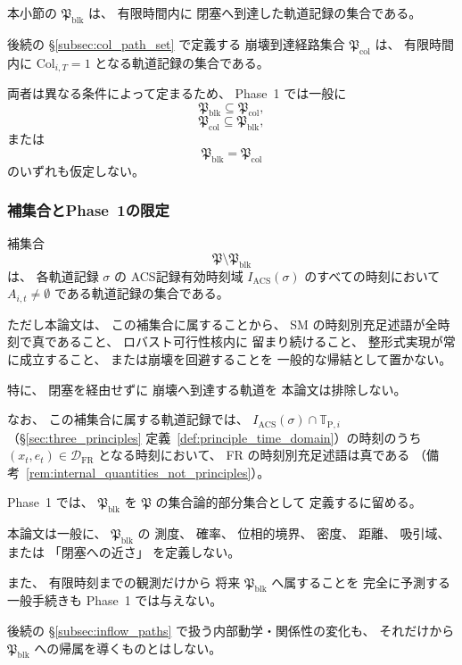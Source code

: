 \begin{remark}[閉塞経路集合と崩壊到達経路集合は別対象である]
\label{rem:blk_vs_col}
本小節の
$\mathfrak{P}_{\mathrm{blk}}$
は、
有限時間内に
閉塞へ到達した軌道記録の集合である。

後続の
\S\ref{subsec:col_path_set}
で定義する
崩壊到達経路集合
$\mathfrak{P}_{\mathrm{col}}$
は、
有限時間内に
$\mathrm{Col}_{i,T}=1$
となる軌道記録の集合である。

両者は異なる条件によって定まるため、
Phase~1 では一般に
\[
  \mathfrak{P}_{\mathrm{blk}}
  \subseteq
  \mathfrak{P}_{\mathrm{col}},
\]
\[
  \mathfrak{P}_{\mathrm{col}}
  \subseteq
  \mathfrak{P}_{\mathrm{blk}},
\]
または
\[
  \mathfrak{P}_{\mathrm{blk}}
  =
  \mathfrak{P}_{\mathrm{col}}
\]
のいずれも仮定しない。
\end{remark}

\subsubsection{補集合とPhase~1の限定}

\begin{remark}
\label{rem:blk_in_trajectory_space}
補集合
\[
  \mathfrak{P}
  \setminus
  \mathfrak{P}_{\mathrm{blk}}
\]
は、
各軌道記録 $\sigma$ の
ACS記録有効時刻域
$I_{\mathrm{ACS}}(\sigma)$
のすべての時刻において
$A_{i,t}\neq\emptyset$
である軌道記録の集合である。

ただし本論文は、
この補集合に属することから、
SM の時刻別充足述語が全時刻で真であること、
ロバスト可行性核内に
留まり続けること、
整形式実現が常に成立すること、
または崩壊を回避することを
一般的な帰結として置かない。

特に、
閉塞を経由せずに
崩壊へ到達する軌道を
本論文は排除しない。

なお、
この補集合に属する軌道記録では、
$I_{\mathrm{ACS}}(\sigma)\cap\mathbb{T}_{\mathrm{P},i}$（\S\ref{sec:three_principles} 定義~\ref{def:principle_time_domain}）の時刻のうち
$(x_t,e_t)\in\mathcal{D}_{\mathrm{FR}}$ となる時刻において、
FR の時刻別充足述語は真である
（備考~\ref{rem:internal_quantities_not_principles}）。
\end{remark}

\begin{remark}
\label{rem:blk_phase1_scope}
Phase~1 では、
$\mathfrak{P}_{\mathrm{blk}}$
を
$\mathfrak{P}$ の集合論的部分集合として
定義するに留める。

本論文は一般に、
$\mathfrak{P}_{\mathrm{blk}}$ の
測度、
確率、
位相的境界、
密度、
距離、
吸引域、
または
「閉塞への近さ」
を定義しない。

また、
有限時刻までの観測だけから
将来
$\mathfrak{P}_{\mathrm{blk}}$
へ属することを
完全に予測する一般手続きも
Phase~1 では与えない。

後続の
\S\ref{subsec:inflow_paths}
で扱う内部動学・関係性の変化も、
それだけから
$\mathfrak{P}_{\mathrm{blk}}$
への帰属を導くものとはしない。
\end{remark}

